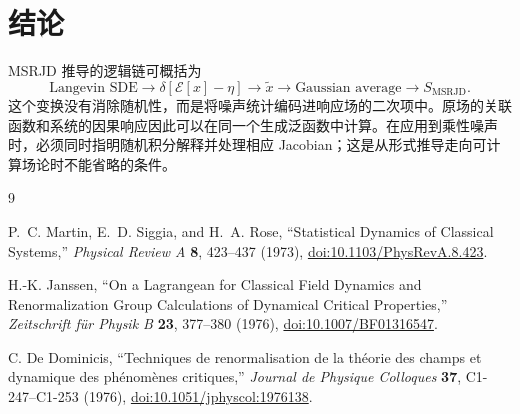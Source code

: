 \documentclass[UTF8,11pt,a4paper]{ctexart}
\newcommand{\E}{\mathcal E}
\begin{document}
\section{结论}

MSRJD 推导的逻辑链可概括为
\begin{equation*}
\text{Langevin SDE}
\longrightarrow
\delta[\E[x]-\eta]
\longrightarrow
\widetilde x
\longrightarrow
\text{Gaussian average}
\longrightarrow
S_{\mathrm{MSRJD}}.
\end{equation*}
这个变换没有消除随机性，而是将噪声统计编码进响应场的二次项中。原场的关联函数和系统的因果响应因此可以在同一个生成泛函数中计算。在应用到乘性噪声时，必须同时指明随机积分解释并处理相应 Jacobian；这是从形式推导走向可计算场论时不能省略的条件。

\begin{thebibliography}{9}

P.~C. Martin, E.~D. Siggia, and H.~A. Rose,
``Statistical Dynamics of Classical Systems,''
\emph{Physical Review A} \textbf{8}, 423--437 (1973),
\href{https://doi.org/10.1103/PhysRevA.8.423}{doi:10.1103/PhysRevA.8.423}.

H.-K. Janssen,
``On a Lagrangean for Classical Field Dynamics and Renormalization Group Calculations of Dynamical Critical Properties,''
\emph{Zeitschrift f\"ur Physik B} \textbf{23}, 377--380 (1976),
\href{https://doi.org/10.1007/BF01316547}{doi:10.1007/BF01316547}.

C. De Dominicis,
``Techniques de renormalisation de la th\'eorie des champs et dynamique des ph\'enom\`enes critiques,''
\emph{Journal de Physique Colloques} \textbf{37}, C1-247--C1-253 (1976),
\href{https://doi.org/10.1051/jphyscol:1976138}{doi:10.1051/jphyscol:1976138}.

\end{thebibliography}
\end{document}
